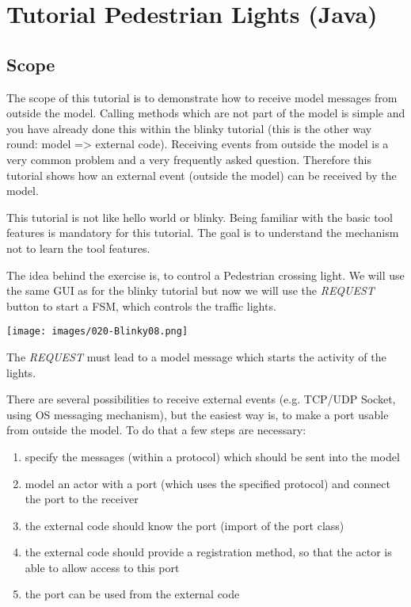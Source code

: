\chapter{Tutorial Pedestrian Lights (Java)}

\section{Scope}

The scope of this tutorial is to demonstrate how to receive model messages from outside the model. Calling 
methods which are not part of the model is simple and you have already done this within the blinky 
tutorial (this is the other way round: model => external code). Receiving events from outside the model is 
a very common problem and a very frequently asked question. Therefore this tutorial shows how an external 
event (outside the model) can be received by the model.

This tutorial is not like hello world or blinky. Being familiar with the basic tool features is mandatory 
for this tutorial. The goal is to understand the mechanism not to learn the tool features.

The idea behind the exercise is, to control a Pedestrian crossing light. We will use the same GUI as for 
the blinky tutorial but now we will use the \textit{REQUEST} button to start a FSM, which controls the 
traffic lights.

\texttt{[image: images/020-Blinky08.png]}

The \textit{REQUEST} must lead to a model message which starts the activity of the lights.

There are several possibilities to receive external events (e.g. TCP/UDP Socket, using OS messaging 
mechanism), but the easiest way is, to make a port usable from outside the model. To do that a few steps 
are necessary:
\begin{enumerate}
\item specify the messages (within a protocol) which should be sent into the model
\item model an actor with a port (which uses the specified protocol) and connect the port to the receiver 
\item the external code should know the port (import of the port class)
\item the external code should provide a registration method, so that the actor is able to allow access to 
this port
\item the port can be used from the external code
\end{enumerate}


